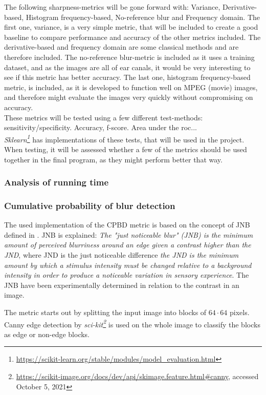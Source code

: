 The following sharpness-metrics will be gone forward with: Variance, Derivative-based, Histogram frequency-based, No-reference blur and Frequency domain. The first one, variance, is a very simple metric, that will be included to create a good baseline to compare performance and accuracy of the other metrics included. The derivative-based and frequency domain are some classical methods\cite{} and are therefore included. The no-reference blur-metric is included as it uses a training dataset, and as the images are all of ear canals, it would be very interesting to see if this metric has better accuracy. The last one, histogram frequency-based metric, is included, as it is developed to function well on MPEG (movie) images, and therefore might evaluate the images very quickly without compromising on accuracy.\\
These metrics will be tested using a few different test-methods: sensitivity/specificity. Accuracy, f-score. Area under the roc...\\
\textit{Sklearn\footnote{\url{https://scikit-learn.org/stable/modules/model_evaluation.html}}} has implementations of these tests, that will be used in the project.\\
When testing, it will be assessed whether a few of the metrics should be used together in the final program, as they might perform better that way.



\subsubsection{Analysis of running time}

\subsubsection{Cumulative probability of blur detection}
The used implementation of the CPBD metric\cite{code_CPBD} is based on the concept of JNB defined in \cite{JBN}. JNB is explained: \textit{The "just noticeable blur" (JNB) is the minimum amount of perceived blurriness around an edge given a contrast higher than the JND}\cite{JNB}, where JND is the just noticeable difference \textit{the JND is the minimum amount by which a stimulus intensity must be changed relative to a background intensity in order to produce a noticeable variation in sensory experience}\cite{JNB}. The JNB have been experimentally determined in relation to the contrast in an image.

The metric starts out by splitting the input image into blocks of $64\cdot 64$ pixels. Canny edge detection by \textit{sci-kit\footnote{\url{https://scikit-image.org/docs/dev/api/skimage.feature.html\#canny}, accessed October 5, 2021}} is used on the whole image to classify the blocks as edge or non-edge blocks.

